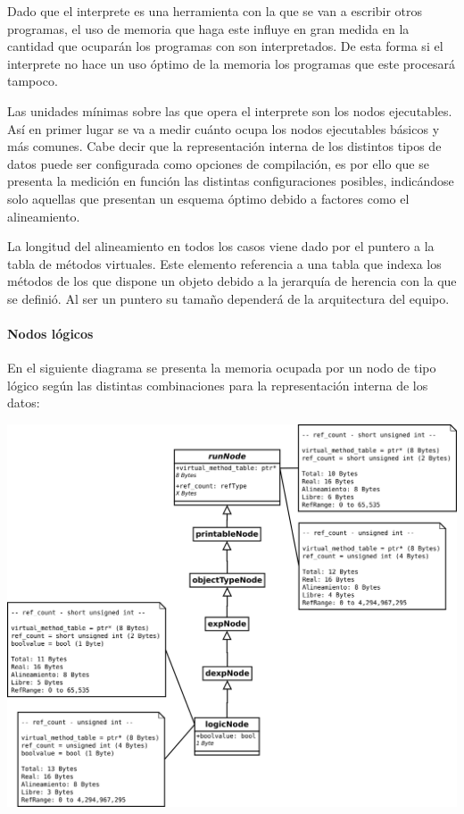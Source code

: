 Dado que el interprete es una herramienta con la que se van a escribir otros programas, el uso de memoria que haga este influye en gran medida 
en la cantidad que ocuparán los programas con son interpretados. De esta forma si el interprete no hace un uso óptimo de la memoria los programas que este procesará
tampoco. 

Las unidades mínimas sobre las que opera el interprete son los nodos ejecutables. Así en primer lugar se va a medir cuánto ocupa los nodos ejecutables básicos y más comunes. Cabe decir
que la representación interna de los distintos tipos de datos puede ser configurada como opciones de compilación, es por ello que se presenta la medición en función las distintas 
configuraciones posibles, indicándose solo aquellas que presentan un esquema óptimo debido a factores como el alineamiento.

La longitud del alineamiento en todos los casos viene dado por el puntero a la tabla de métodos virtuales. Este elemento referencia a una tabla que indexa los 
métodos de los que dispone un objeto debido a la jerarquía de herencia con la que se definió. Al ser un puntero su tamaño dependerá de la arquitectura del equipo.

\pagebreak 

\paragraph{Nodos lógicos}

En el siguiente diagrama se presenta la memoria ocupada por un nodo de tipo lógico según las distintas combinaciones para la representación interna de los datos:

\begin{center}
\includegraphics[scale=0.3]{memorySpaceLogic.png} \\
\end{center}


